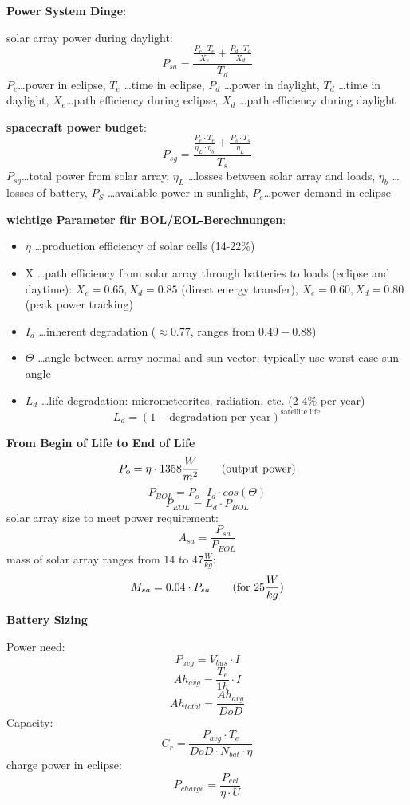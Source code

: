 \documentclass[a4paper,10pt]{article}
\newcommand{\f}{\textbf}
\begin{document}
\noindent \f{Power System Dinge}:\\
\vspace*{3pt}

\noindent solar array power during daylight:
\[P_{sa} = \frac{\frac{P_e\cdot T_e}{X_e}+ \frac{P_d\cdot T_d}{X_d}}{T_d}\]
$P_e$\dots power in eclipse, $T_e$ \dots time in eclipse, $P_d$ \dots power in daylight, $T_d$ \dots time in daylight, $X_e$\dots path efficiency during eclipse, $X_d$ \dots path 
efficiency during daylight\\
\vspace*{5pt}

\noindent \f{spacecraft power budget}:
\[P_{sg} = \frac{\frac{P_e\cdot T_e}{\eta_L\cdot \eta_b}+ \frac{P_s\cdot T_s}{\eta_L}}{T_s}\]
$P_{sg}$\dots total power from solar array, $\eta_L$ \dots losses between solar array and loads, $\eta_b$ \dots losses of battery, $P_S$ \dots available power in sunlight, $P_e$\dots power demand in 
eclipse\\
\vspace*{3pt}

\noindent \f{wichtige Parameter für BOL/EOL-Berechnungen}:
\begin{itemize}
 \item $\eta$ \dots production efficiency of solar cells (14-22\%)
 \item X \dots path efficiency from solar array through batteries to loads (eclipse and daytime): $X_e=0.65, X_d=0.85$ (direct energy transfer), $X_e=0.60, X_d=0.80$ (peak power tracking)
 \item $I_d$ \dots inherent degradation ($\approx 0.77$, ranges from $0.49-0.88$)
 \item $\Theta$ \dots angle between array normal and sun vector; typically use worst-case sun-angle
 \item $L_d$ \dots life degradation: micrometeorites, radiation, etc. (2-4\% per year)\[L_d = (1-\text{degradation per year})^{\text{satellite life}}\]
\end{itemize}

\vspace*{5pt}

\noindent \f{From Begin of Life to End of Life}
\[P_{o} = \eta\cdot 1358\frac{W}{m^2} \text{\qquad (output power)}\]
\[P_{BOL} = P_o\cdot I_d\cdot cos(\Theta)\]
\[P_{EOL} = L_d\cdot P_{BOL}\]
solar array size to meet power requirement:
\[A_{sa} = \frac{P_{sa}}{P_{EOL}}\]
mass of solar array ranges from $14$ to $47 \frac{W}{kg}$:
\[M_{sa} = 0.04\cdot P_{sa} \text{\qquad (for } 25 \frac{W}{kg})\]

\noindent \f{Battery Sizing}\\
\vspace*{3pt}

\noindent Power need:
\[P_{avg} = V_{bus}\cdot I\]
\[Ah_{avg} = \frac{T_e}{1h}\cdot I\]
\[Ah_{total} = \frac{Ah_{avg}}{DoD}\]
Capacity:
\[C_r = \frac{P_{avg}\cdot T_e}{DoD\cdot N_{bat} \cdot \eta}\]
charge power in eclipse:
\[ P_{charge} = \frac{P_{ecl}}{\eta \cdot U} \]
\end{document}
